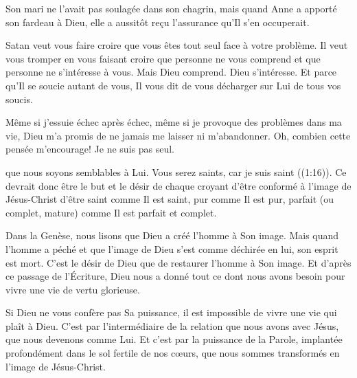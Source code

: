 
Son mari ne l'avait pas soulagée dans son chagrin,
 mais quand Anne a apporté son fardeau à Dieu,
 elle a aussitôt reçu l'assurance qu'Il s'en occuperait.

Satan veut vous faire croire que vous êtes tout seul face à votre problème.
 Il veut vous tromper en vous faisant croire que personne ne vous comprend
 et que personne ne s'intéresse à vous. Mais Dieu comprend. Dieu s'intéresse.
 Et parce qu'Il se soucie autant de vous, Il vous dit de vous décharger
 sur Lui de tous vos soucis.

Même si j'essuie échec après échec, même si je provoque des problèmes
 dans ma vie, Dieu m'a promis de ne jamais me laisser ni m'abandonner.
 Oh, combien cette pensée m'encourage! Je ne suis pas seul.

\dvrule






 que nous soyons semblables à Lui.
 \og Vous serez saints, car je suis saint \fg{} ((1:16)).
 Ce devrait donc être le but et le désir de chaque croyant d'être conformé
 à l'image de Jésus-Christ \ocadr d'être saint comme Il est saint,
 pur comme Il est pur, parfait (ou complet, mature)
 comme Il est parfait et complet.

Dans la Genèse, nous lisons que Dieu a créé l'homme à Son image.
 Mais quand l'homme a péché et que l'image de Dieu s'est comme déchirée en lui,
 son esprit est mort. C'est le désir de Dieu que de restaurer l'homme
 à Son image. Et d'après ce passage de l'Écriture,
 Dieu nous a donné tout ce dont nous avons besoin
 pour vivre une vie de vertu glorieuse.


Si Dieu ne vous confère pas Sa puissance, il est impossible de vivre une vie
 qui plaît à Dieu. C'est par l'intermédiaire de la relation que nous avons
 avec Jésus, que 
 nous devenons comme Lui. Et c'est par la puissance de la Parole,
 implantée profondément dans le sol fertile de nos c\oe{}urs,
 que nous sommes transformés en l'image de Jésus-Christ.


